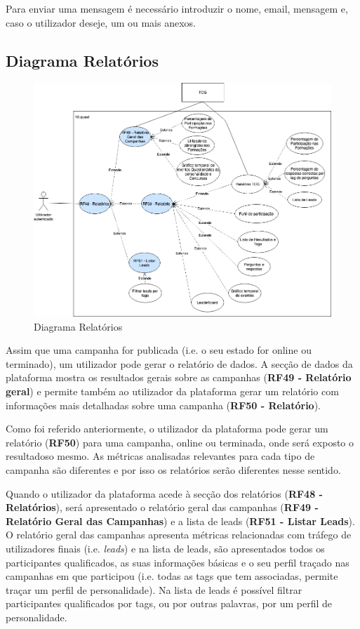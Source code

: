 Para enviar uma mensagem é necessário introduzir o nome, email, mensagem e, caso o utilizador deseje, um ou mais anexos.

\newpage

\subsection{Diagrama Relatórios}
\label{d:relatorios}

\begin{figure}[ht!]
	\begin{center}
		\includegraphics[width=1\textwidth]{img/rf/relatorio}
		\caption{Diagrama Relatórios}
		\label{fig:rf-relatorios}
	\end{center}
\end{figure}

Assim que uma campanha for publicada (i.e. o seu estado for online ou terminado), um utilizador pode gerar o relatório de dados. A secção de dados da plataforma mostra os resultados gerais sobre as campanhas (\textbf{RF49 - Relatório geral}) e permite também ao utilizador da plataforma gerar um relatório com informações mais detalhadas sobre uma campanha (\textbf{RF50 - Relatório}).

Como foi referido anteriormente, o utilizador da plataforma pode gerar um relatório (\textbf{RF50}) para uma campanha, online ou terminada, onde será exposto o resultadoso mesmo. As métricas analisadas relevantes para cada tipo de campanha são diferentes e por isso os relatórios serão diferentes nesse sentido.

Quando o utilizador da plataforma acede à secção dos relatórios (\textbf{RF48 - Relatórios}), será apresentado o relatório geral das campanhas (\textbf{RF49 - Relatório Geral das Campanhas}) e a lista de leads (\textbf{RF51 - Listar Leads}). O relatório geral das campanhas apresenta métricas relacionadas com tráfego de utilizadores finais (i.e. \textit{leads}) e na lista de leads, são apresentados todos os participantes qualificados, as suas informações básicas e o seu perfil traçado nas campanhas em que participou (i.e. todas as tags que tem associadas, permite traçar um perfil de personalidade). Na lista de leads é possível filtrar participantes qualificados por tags, ou por outras palavras, por um perfil de personalidade.
	
